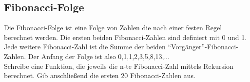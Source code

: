 \subsection{Fibonacci-Folge }
Die Fibonacci-Folge ist eine Folge von Zahlen die nach einer festen Regel berechnet werden.
Die ersten beiden Fibonacci-Zahlen sind definiert mit 0 und 1. Jede weitere Fibonacci-Zahl
ist die Summe der beiden "`Vorgänger"'-Fibonacci-Zahlen. Der Anfang der Folge ist also 0,1,1,2,3,5,8,13,...
\\Schreibe eine Funktion, die jeweils die n-te Fibonacci-Zahl mittels Rekursion berechnet.
Gib anschließend die ersten 20 Fibonacci-Zahlen aus.
